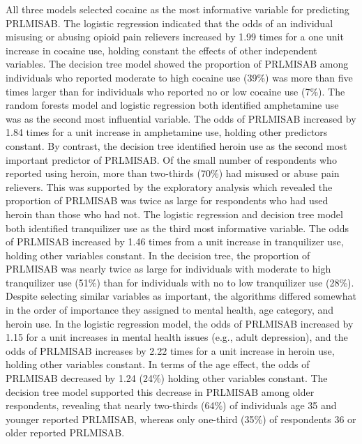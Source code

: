 \documentclass[sigconf]{acmart}
\begin{document}
All three models selected cocaine as the most informative variable for 
predicting PRLMISAB. The logistic regression indicated that the odds of an 
individual misusing or abusing opioid pain relievers increased by 1.99 times 
for a one unit increase in cocaine use, holding constant the effects of other 
independent variables. The decision tree model showed the proportion of 
PRLMISAB among individuals who reported moderate to high cocaine use (39\%) 
was more than five times larger than for individuals who reported no or low 
cocaine use (7\%). The random forests model and logistic regression both 
identified amphetamine use was as the second most influential variable. 
The odds of PRLMISAB increased by 1.84 times for a unit increase in 
amphetamine use, holding other predictors constant. By contrast, the decision 
tree identified heroin use as the second most important predictor of PRLMISAB. 
Of the small number of respondents who reported using heroin, more than 
two-thirds (70\%) had misused or abuse pain relievers. This was supported by 
the exploratory analysis which revealed the proportion of PRLMISAB was twice 
as large for respondents who had used heroin than those who had not. The 
logistic regression and decision tree model both identified tranquilizer use 
as the third most informative variable. The odds of PRLMISAB increased by 
1.46 times from a unit increase in tranquilizer use, holding other 
variables constant. In the decision tree, the proportion of PRLMISAB was 
nearly twice as large for individuals with moderate to high tranquilizer
use (51\%) than for individuals with no to low tranquilizer use (28\%). 
Despite selecting similar variables as important, the algorithms differed 
somewhat in the order of importance they assigned to mental health, age 
category, and heroin use. In the logistic regression model, the odds of 
PRLMISAB increased by 1.15 for a unit increases in mental health issues 
(e.g., adult depression), and the odds of PRLMISAB increases by 2.22 
times for a unit increase in heroin use, holding other variables constant. 
In terms of the age effect, the odds of PRLMISAB decreased by 1.24 (24\%) 
holding other variables constant. The decision tree model supported this
decrease in PRLMISAB among older respondents, revealing that nearly 
two-thirds (64\%) of individuals age 35 and younger reported PRLMISAB,
whereas only one-third (35\%) of respondents 36 or older reported PRLMISAB.

\end{document}
